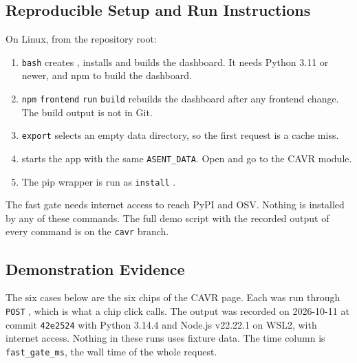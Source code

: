 \subsection{Reproducible Setup and Run Instructions}
On Linux, from the repository root:
\begin{sloppypar}
\begin{enumerate}
    \item \texttt{bash}  creates , installs  and builds the dashboard. It needs Python 3.11 or newer, and npm to build the dashboard.
    \item \texttt{npm}  \texttt{frontend} \texttt{run} \texttt{build} rebuilds the dashboard after any frontend change. The build output  is not in Git.
    \item \texttt{export}  selects an empty data directory, so the first request is a cache miss.
    \item {}        starts the app with the same \texttt{ASENT\_DATA}. Open  and go to the CAVR module.
    \item The pip wrapper is run as        \texttt{install} .
\end{enumerate}
\end{sloppypar}
The fast gate needs internet access to reach PyPI and OSV. Nothing is installed by any of these commands. The full demo script with the recorded output of every command is  on the \texttt{cavr} branch.

\subsection{Demonstration Evidence}\label{sec:cavr-demo}
\begin{sloppypar}
The six cases below are the six chips of the CAVR page. Each was run through \texttt{POST} , which is what a chip click calls. The output was recorded on 2026-10-11 at commit \texttt{42e2524} with Python 3.14.4 and Node.js v22.22.1 on WSL2, with internet access. Nothing in these runs uses fixture data. The time column is \texttt{fast\_gate\_ms}, the wall time of the whole request.
\end{sloppypar}

